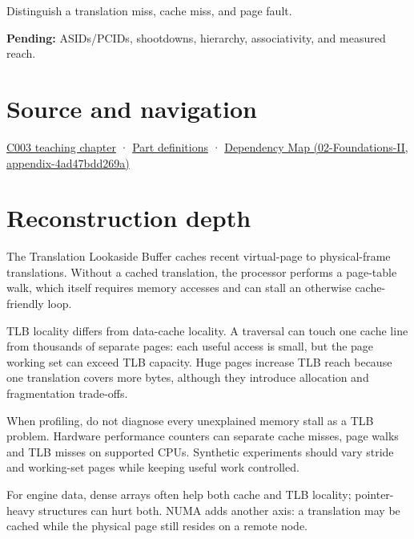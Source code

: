 Distinguish a translation miss, cache miss, and page fault.

\textbf{Pending:} ASIDs/PCIDs, shootdowns, hierarchy, associativity, and measured reach.

\section{Source and navigation}\label{appendix-7a2d9c5ce511-source-and-navigation}

\href{Continuous\%20Notes/Computing\%20Foundations\%20-\%20From\%20Bits\%20to\%20C++\%20and\%20Systems\%20APIs\#Where\%20the\%20bytes\%20live}{C003 teaching chapter} · \hyperref[appendix-fd090d982a15-m003---parts-41-60]{Part definitions} · \href{../02-Foundations-II/main.pdf\#nameddest=appendix-4ad47bdd269a}{Dependency Map (02-Foundations-II, appendix-4ad47bdd269a)}

\section{Reconstruction depth}\label{appendix-7a2d9c5ce511-reconstruction-depth}

The Translation Lookaside Buffer caches recent virtual-page to physical-frame translations. Without a cached translation, the processor performs a page-table walk, which itself requires memory accesses and can stall an otherwise cache-friendly loop.

TLB locality differs from data-cache locality. A traversal can touch one cache line from thousands of separate pages: each useful access is small, but the page working set can exceed TLB capacity. Huge pages increase TLB reach because one translation covers more bytes, although they introduce allocation and fragmentation trade-offs.

When profiling, do not diagnose every unexplained memory stall as a TLB problem. Hardware performance counters can separate cache misses, page walks and TLB misses on supported CPUs. Synthetic experiments should vary stride and working-set pages while keeping useful work controlled.

For engine data, dense arrays often help both cache and TLB locality; pointer-heavy structures can hurt both. NUMA adds another axis: a translation may be cached while the physical page still resides on a remote node.
